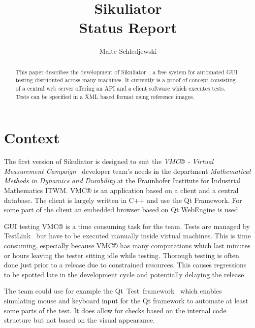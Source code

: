 \documentclass[a4paper,twocolumn,twoside]{article}
\title{Sikuliator\\ 
	\large Status Report}
\author{Malte Schledjewski}
\newcommand{\VMC}[0]{VMC®}
\newcommand{\Sik}[0]{Sikuliator}
\begin{document}


\maketitle
\begin{abstract}
	This paper describes the development of \Sik{}~\cite{Sikuliator}, 
	a free system for automated GUI testing distributed across many machines.
	It currently is a proof of concept consisting of a central web server offering an API and 
	a client software which executes tests.
	Tests can be specified in a XML based format using reference images.
\end{abstract}

\tableofcontents

\section{Context}

The first version of \Sik{} is designed to suit the 
\emph{\VMC{} - Virtual Measurement Campaign}~\cite{VMConline} developer team's needs in the
department \emph{Mathematical Methods in Dynamics and Durability} 
at the Fraunhofer Institute for Industrial Mathematics ITWM.
\VMC{} is an application based on a client and a central database.
The client is largely written in C++ and use the Qt Framework.
For some part of the client an embedded browser based on Qt WebEngine is used.

GUI testing \VMC{} is a time consuming task for the team.
Tests are managed by TestLink~\cite{TestLink} but have to be executed manually inside virtual machines.
This is time consuming, especially because \VMC{} has many computations which last minutes or hours 
leaving the tester sitting idle while testing. 
Thorough testing is often done just prior to a release due to constrained resources.
This causes regressions to be spotted late in the development cycle and potentially delaying the release. 

The team could use for example the Qt~Test~framework~\cite{QtTest} which enables simulating mouse and keyboard input for the Qt framework to automate at least some parts of the test.
It does allow for checks based on the internal code structure but not based on the visual appearance.
\end{document}
